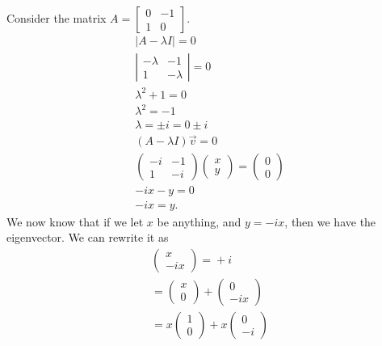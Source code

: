 \begin{eg}
  Consider the matrix $A=\begin{bmatrix} 0&-1\\1&0 \end{bmatrix} $.
  \begin{align*}
    | A-\lambda I| = 0\\
    \left| \begin{matrix} -\lambda&-1\\1&-\lambda \end{matrix} \right| =0\\
    \lambda^2+1=0\\
    \lambda^2 = -1\\
    \lambda = \pm i = 0\pm i\\
    (A-\lambda I) \vec{v} = 0\\
    \begin{pmatrix} -i&-1\\1&-i \end{pmatrix} \begin{pmatrix} x\\y \end{pmatrix} =\begin{pmatrix} 0\\0 \end{pmatrix} \\
    -ix-y=0\\
    -ix=y
  .\end{align*}
  We now know that if we let $x$ be anything, and $y=-ix$, then we have the eigenvector. We can rewrite it as 
  \begin{align*}
    \begin{pmatrix} x\\-ix \end{pmatrix} =\boxed{} + i\boxed{}\\
    =\begin{pmatrix} x\\0 \end{pmatrix}+\begin{pmatrix} 0\\-ix \end{pmatrix}\\
    =x\begin{pmatrix} 1\\0 \end{pmatrix}+x\begin{pmatrix} 0\\-i \end{pmatrix}  \\

\end{align*}
\end{eg}
